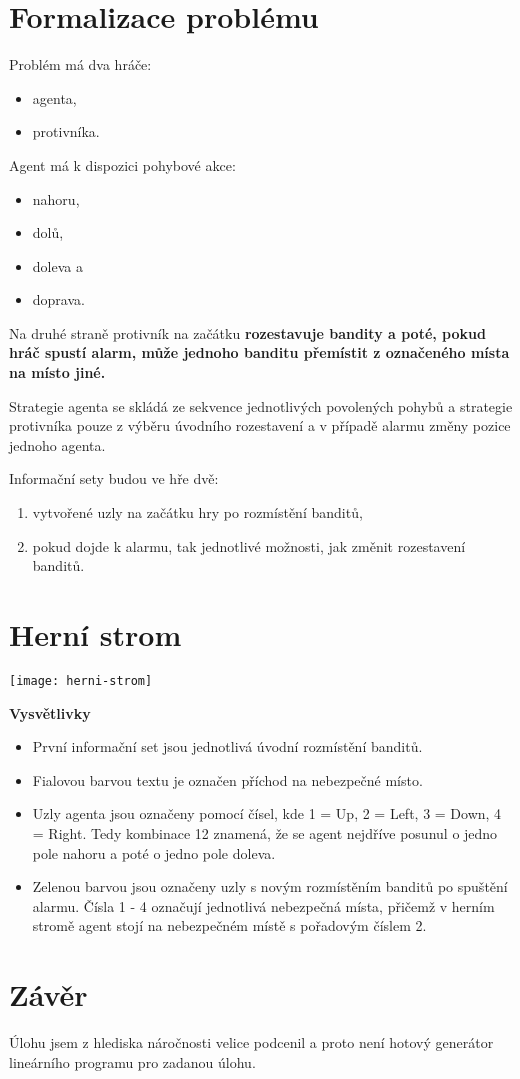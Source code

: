 \section{Formalizace problému}

Problém má dva hráče:

\begin{itemize}
    \item agenta,
    \item protivníka.
\end{itemize}

Agent má k dispozici pohybové akce:

\begin{itemize}
    \item nahoru,
    \item dolů,
    \item doleva a
    \item doprava.
\end{itemize}

Na druhé straně protivník na začátku \bf{rozestavuje bandity} a poté, pokud hráč spustí alarm, může \bf{jednoho banditu přemístit} z označeného místa na místo jiné.

Strategie agenta se skládá ze sekvence jednotlivých povolených pohybů a strategie protivníka pouze z výběru úvodního rozestavení a v případě alarmu změny pozice jednoho agenta.

Informační sety budou ve hře dvě:

\begin{enumerate} 
    \item vytvořené uzly na začátku hry po rozmístění banditů,
    \item pokud dojde k alarmu, tak jednotlivé možnosti, jak změnit rozestavení banditů.
\end{enumerate}

\section{Herní strom}

\begin{center}
    \texttt{[image: herni-strom]}
\end{center}

\bf{Vysvětlivky}
\begin{itemize}
    \item První informační set jsou jednotlivá úvodní rozmístění banditů.
    \item Fialovou barvou textu je označen příchod na nebezpečné místo.
    \item Uzly agenta jsou označeny pomocí čísel, kde 1 = Up, 2 = Left, 3 = Down, 4 = Right. Tedy kombinace 12 znamená, že se agent nejdříve posunul o jedno pole nahoru a poté o jedno pole doleva.
    \item Zelenou barvou jsou označeny uzly s novým rozmístěním banditů po spuštění alarmu. Čísla 1 - 4 označují jednotlivá nebezpečná místa, přičemž v herním stromě agent stojí na nebezpečném místě s pořadovým číslem 2.
\end{itemize}

\section{Závěr}

Úlohu jsem z hlediska náročnosti velice podcenil a proto není hotový generátor lineárního programu pro zadanou úlohu.
